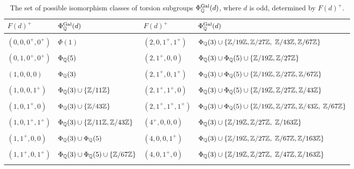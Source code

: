         \begin{table}[!ht]
        \centering
        \caption{The set of possible isomorphism classes of torsion subgroups $\Phi_{\mathbb{Q}}^{\operatorname{Gal}}(d)$, where $d$ is odd, determined by $F(d)^+$.\label{tab:oddtorsiongroups}}
        \begin{tabular}{>{\raggedright\arraybackslash}p{2.4cm}|%
           >{\centering\arraybackslash}p{5cm}||%
           >{\raggedright\arraybackslash}p{2.6cm}|%
           >{\centering\arraybackslash}p{5cm}%
          } \hline
        $F(d)^+$ & $\Phi_{\mathbb{Q}}^{\operatorname{Gal}}(d)$ & $F(d)^+$ & $\Phi_{\mathbb{Q}}^{\operatorname{Gal}}(d)$  \\ \hline
        & & & \\ %
        $(0,0,0^+,0^+)$ & $\Phi(1)$ & $(2,0,1^+,1^+)$ & $\Phi_{\mathbb{Q}}(3) \cup \{ \mathbb{Z}/19\mathbb{Z}, \mathbb{Z}/27\mathbb{Z},$ $\mathbb{Z}/43\mathbb{Z}, \mathbb{Z}/67\mathbb{Z} \}$ \\
        & & & \\ %
        $(0,1,0^+,0^+)$ & $\Phi_{\mathbb{Q}}(5)$ & $(2,1^+,0,0)$ & $\Phi_{\mathbb{Q}}(3) \cup \Phi_{\mathbb{Q}}(5) \cup \{ \mathbb{Z}/19\mathbb{Z}, \mathbb{Z}/27\mathbb{Z} \}$ \\
        & & & \\ %
        $(1,0,0,0)$ & $\Phi_{\mathbb{Q}}(3)$ & $(2,1^+,0,1^+)$ & $\Phi_{\mathbb{Q}}(3) \cup \Phi_{\mathbb{Q}}(5) \cup \{ \mathbb{Z}/19\mathbb{Z}, \mathbb{Z}/27\mathbb{Z}, \mathbb{Z}/67\mathbb{Z} \}$ \\
        & & & \\ %
        $(1,0,0,1^+)$ & $\Phi_{\mathbb{Q}}(3) \cup \{ \mathbb{Z}/11\mathbb{Z} \}$ & $(2,1^+,1^+,0)$ & $\Phi_{\mathbb{Q}}(3) \cup \Phi_{\mathbb{Q}}(5) \cup \{ \mathbb{Z}/19\mathbb{Z}, \mathbb{Z}/27\mathbb{Z}, \mathbb{Z}/43\mathbb{Z} \}$ \\
        & & & \\ %
        $(1,0,1^+,0)$ & $\Phi_{\mathbb{Q}}(3) \cup \{ \mathbb{Z}/43\mathbb{Z} \}$ & $(2,1^+,1^+,1^+)$ & $\Phi_{\mathbb{Q}}(3) \cup \Phi_{\mathbb{Q}}(5) \cup \{ \mathbb{Z}/19\mathbb{Z}, \mathbb{Z}/27\mathbb{Z}, \mathbb{Z}/43\mathbb{Z},$ $\mathbb{Z}/67\mathbb{Z} \}$ \\
        & & & \\ %
        $(1,0,1^+,1^+)$ & $\Phi_{\mathbb{Q}}(3) \cup \{ \mathbb{Z}/11\mathbb{Z}, \mathbb{Z}/43\mathbb{Z} \}$ & $(4^+,0,0,0)$ & $\Phi_{\mathbb{Q}}(3) \cup \{ \mathbb{Z}/19\mathbb{Z}, \mathbb{Z}/27\mathbb{Z},$ $\mathbb{Z}/163\mathbb{Z} \}$ \\
        & & & \\ %
        $(1,1^+,0,0)$ & $\Phi_{\mathbb{Q}}(3) \cup \Phi_{\mathbb{Q}}(5)$ & $(4,0,0,1^+)$ & $\Phi_{\mathbb{Q}}(3) \cup \{ \mathbb{Z}/19\mathbb{Z}, \mathbb{Z}/27\mathbb{Z},$ $\mathbb{Z}/67\mathbb{Z}, \mathbb{Z}/163\mathbb{Z} \}$ \\
        & & & \\ %
        $(1,1^+,0,1^+)$ & $\Phi_{\mathbb{Q}}(3) \cup \Phi_{\mathbb{Q}}(5) \cup \{ \mathbb{Z}/67\mathbb{Z} \}$ & $(4,0,1^+,0)$ & $\Phi_{\mathbb{Q}}(3) \cup \{ \mathbb{Z}/19\mathbb{Z}, \mathbb{Z}/27\mathbb{Z},$ $\mathbb{Z}/47\mathbb{Z}, \mathbb{Z}/163\mathbb{Z} \}$ \\
        & & & \\ %

\end{tabular}
\end{table}
